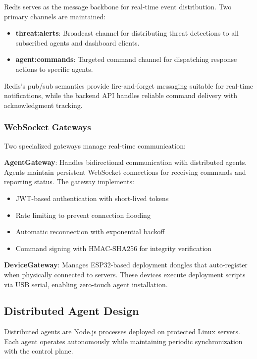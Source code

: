 Redis serves as the message backbone for real-time event distribution. Two primary channels are maintained:

\begin{itemize}
    \item \textbf{threat:alerts}: Broadcast channel for distributing threat detections to all subscribed agents and dashboard clients.
    \item \textbf{agent:commands}: Targeted command channel for dispatching response actions to specific agents.
\end{itemize}

Redis's pub/sub semantics provide fire-and-forget messaging suitable for real-time notifications, while the backend API handles reliable command delivery with acknowledgment tracking.

\subsubsection{WebSocket Gateways}

Two specialized gateways manage real-time communication:

\textbf{AgentGateway}: Handles bidirectional communication with distributed agents. Agents maintain persistent WebSocket connections for receiving commands and reporting status. The gateway implements:
\begin{itemize}
    \item JWT-based authentication with short-lived tokens
    \item Rate limiting to prevent connection flooding
    \item Automatic reconnection with exponential backoff
    \item Command signing with HMAC-SHA256 for integrity verification
\end{itemize}

\textbf{DeviceGateway}: Manages ESP32-based deployment dongles that auto-register when physically connected to servers. These devices execute deployment scripts via USB serial, enabling zero-touch agent installation.

\subsection{Distributed Agent Design}
\label{subsec:agent-design}

Distributed agents are Node.js processes deployed on protected Linux servers. Each agent operates autonomously while maintaining periodic synchronization with the control plane.

